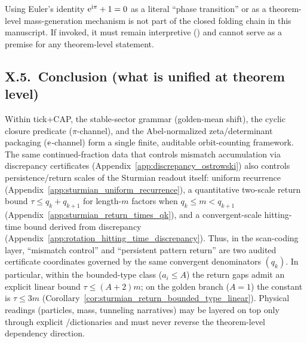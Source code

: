 \AuditTag Using Euler's identity $\mathrm{e}^{\mathrm{i}\pi}+1=0$ as a literal ``phase transition'' or as a theorem-level mass-generation mechanism is not part of the closed folding chain in this manuscript.
If invoked, it must remain interpretive (\AuditTag) and cannot serve as a premise for any theorem-level statement.

\subsection{X.5.\ Conclusion (what is unified at theorem level)}
\label{subsec:x5_geodynamic_conclusion}

\MathTag Within tick+CAP, the stable-sector grammar (golden-mean shift), the cyclic closure predicate ($\pi$-channel), and the Abel-normalized zeta/determinant packaging ($\mathrm{e}$-channel) form a single finite, auditable orbit-counting framework.
\MathTag The same continued-fraction data that controls mismatch accumulation via discrepancy certificates (Appendix~\ref{app:discrepancy_ostrowski}) also controls persistence/return scales of the Sturmian readout itself:
uniform recurrence (Appendix~\ref{app:sturmian_uniform_recurrence}), a quantitative two-scale return bound $\tau\le q_k+q_{k+1}$ for length-$m$ factors when $q_k\le m<q_{k+1}$ (Appendix~\ref{app:sturmian_return_times_qk}), and a convergent-scale hitting-time bound derived from discrepancy (Appendix~\ref{app:rotation_hitting_time_discrepancy}).
Thus, in the scan-coding layer, ``mismatch control'' and ``persistent pattern return'' are two audited certificate coordinates governed by the same convergent denominators $(q_k)$.
In particular, within the bounded-type class ($a_i\le A$) the return gaps admit an explicit linear bound $\tau\le (A+2)m$; on the golden branch ($A=1$) the constant is $\tau\le 3m$ (Corollary~\ref{cor:sturmian_return_bounded_type_linear}).
Physical readings (particles, mass, tunneling narratives) may be layered on top only through explicit \InterfaceTag/\AuditTag dictionaries and must never reverse the theorem-level dependency direction.

